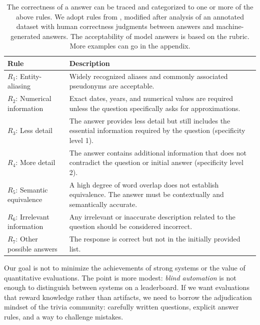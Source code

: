\begin{table}[t]
\centering
\small
\renewcommand{\arraystretch}{1.2}
\begin{tabular}{@{}p{}p{}@{}}
\toprule
\textbf{Rule} & \textbf{Description} \\ \midrule
$R_1$: Entity-aliasing & Widely recognized aliases and commonly associated pseudonyms are acceptable. \\
$R_2$: Numerical information & Exact dates, years, and numerical values are required unless the question specifically asks for approximations. \\
$R_3$: Less detail & The answer provides less detail but still includes the essential information required by the question (specificity level 1). \\
$R_4$: More detail & The answer contains additional information that does not contradict the question or initial answer (specificity level 2). \\
$R_5$: Semantic equivalence & A high degree of word overlap does not establish equivalence. The answer must be contextually and semantically accurate. \\
$R_6$: Irrelevant information & Any irrelevant or inaccurate description related to the question should be considered incorrect. \\
$R_7$: Other possible answers & The response is correct but not in the initially provided list. \\
\bottomrule
\end{tabular}
\caption{The correctness of a \can{} answer can be traced and categorized to
  one or more of the above rules. We adopt rules from , modified
  after analysis of an annotated dataset with human correctness judgments
  between  answers and machine-generated answers. The acceptability of
   model answers is based on the rubric. More examples can go
  in the appendix.}

\label{tab:guidelines}
\end{table}


Our goal is not to minimize the achievements of strong systems or the value of
quantitative evaluations. The point is more modest: \emph{blind automation} is
not enough to distinguish between systems on a leaderboard. If we want
evaluations that reward knowledge rather than artifacts, we need to borrow the
adjudication mindset of the trivia community: carefully written questions,
explicit answer rules, and a way to challenge mistakes.


